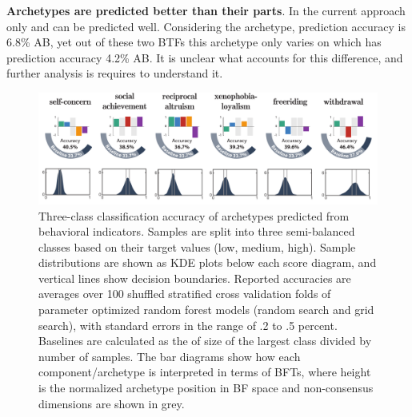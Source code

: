 \textbf{Archetypes are predicted better than their parts}.
In the current approach only \CON and \EXT can be predicted well. Considering the \achiever archetype, prediction accuracy is 6.8\% AB, yet out of these two BTFs this archetype only varies on \CON which has prediction accuracy 4.2\% AB. It is unclear what accounts for this difference, and further analysis is requires to understand it. 

\begin{figure}[h!]
	\centering
	\includegraphics[width=\textwidth]{figures/classification_results_CA}
	\caption{\label{fig:classification_results_CA} Three-class classification accuracy of archetypes predicted from behavioral indicators. Samples are split into three semi-balanced classes based on their target values (low, medium, high). Sample distributions are shown as KDE plots below each score diagram, and vertical lines show decision boundaries. Reported accuracies are averages over 100 shuffled stratified cross validation folds of parameter optimized random forest models (random search and grid search), with standard errors in the range of .2 to .5 percent. Baselines are calculated as the of size of the largest class divided by number of samples. The bar diagrams show how each component/archetype is interpreted in terms of BFTs, where height is the normalized archetype position in BF space and non-consensus dimensions are shown in grey.}
\end{figure}

